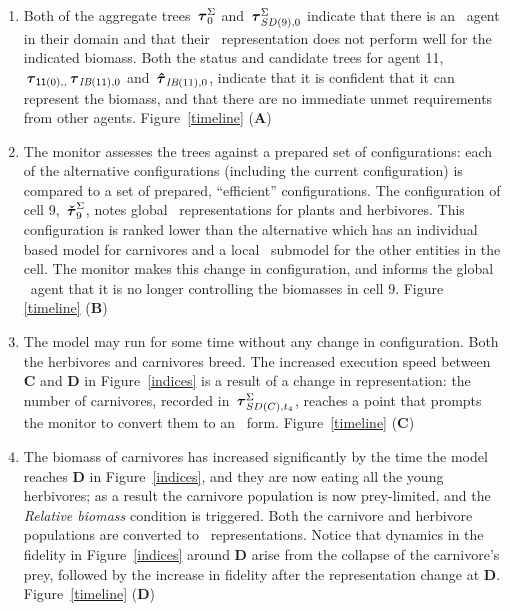 \begin{enumerate}
\item %
Both of the aggregate trees $\,\boldsymbol{\tau}^\Sigma_{0}$ and $\,\boldsymbol{\tau}^\Sigma_{SD(9),0}$ indicate
that there is an \IB\ agent in their domain and that their
\SD\ rep\-re\-sen\-ta\-tion does not perform well for the indicated
biomass. Both the status and candidate trees for agent 11,
$\,\boldsymbol{\tau}_{\mathsf{11}(0),,} \,\boldsymbol{\tau}_{\emph{IB}(11),0}$ and $\,\boldsymbol{\hat{\tau}}_{\mathsf{\emph{IB}}(11),0}$, indicate
that it is confident that it can represent the biomass, and that there
are no immediate unmet requirements from other agents.
Figure~\ref{timeline} (\textbf{A})

\item %
The monitor assesses the trees against a prepared set of
con\-fig\-ur\-a\-tions: each of the alternative con\-fig\-ur\-a\-tions (including the
current con\-fig\-ur\-a\-tion) is compared to a set of prepared, ``efficient''
con\-fig\-ur\-a\-tions.  The con\-fig\-ur\-a\-tion of cell 9, $\,\boldsymbol{\check{\tau}}^\Sigma_{9}$, notes
global \SD\ rep\-re\-sen\-ta\-tions for plants and herbivores. This
con\-fig\-ur\-a\-tion is ranked lower than the alternative which has an
in\-di\-vidu\-al based model for carnivores and a local \SD\ submodel for the
other entities in the cell.   The monitor makes this change in con\-fig\-ur\-a\-tion,
and informs the global \SD\ agent that it is no longer controlling the
biomasses in cell 9. Figure
\ref{timeline} (\textbf{B})\label{firstconv}

\item\label{cv1}
The model may run for some time without any change in con\-fig\-ur\-a\-tion.
Both the herbivores and carnivores breed. The increased execution speed
between \textbf{C} and \textbf{D} in Figure~\ref{indices} is a result
of a change in representation: the number of
carnivores, recorded in $\,\boldsymbol{\tau}^\Sigma_{SD(C),t_4}$, reaches a point that prompts
the monitor to convert them to an \SD\ form.
Figure~\ref{timeline} (\textbf{C})

\item %
The biomass of carnivores has increased significantly by the time the
model reaches \textbf{D} in Figure~\ref{indices},
and they are now eating all the young herbivores; as a result the
carnivore population is now prey-limited, and the \emph{Relative
  biomass} condition is triggered.  Both the carnivore and herbivore
populations are converted to \IB\ rep\-resentations. Notice that
dynamics in the fidelity in Figure~\ref{indices} around \textbf{D}
arise from the collapse of the carnivore's prey, followed by the
increase in fidelity after the representation change at \textbf{D}.
Figure~\ref{timeline} (\textbf{D})


\end{enumerate}
